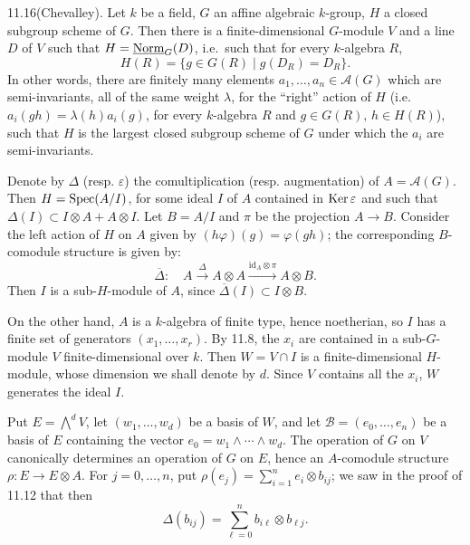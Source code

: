 \begin{theorem}{11.16}\label{VIB.11.16}\textup{(Chevalley).}
Let $k$ be a field, $G$ an affine algebraic $k$-group, $H$ a closed subgroup scheme of $G$. Then there is a finite-dimensional $G$-module $V$ and a line $D$ of $V$ such that $H=\underline{\mathrm{Norm}}_G(D)$, i.e.\ such that for every $k$-algebra $R$,
\[
H(R)=\{g\in G(R)\mid g(D_R)=D_R\}.
\]
In other words, there are finitely many elements $a_1,\ldots,a_n\in\mathscr A(G)$ which are semi-invariants, all of the same weight $\lambda$, for the ``right'' action of $H$ (i.e.\ $a_i(gh)=\lambda(h)a_i(g)$, for every $k$-algebra $R$ and $g\in G(R)$, $h\in H(R)$), such that $H$ is the largest closed subgroup scheme of $G$ under which the $a_i$ are semi-invariants.
\end{theorem}
Denote by $\Delta$ (resp. $\varepsilon$) the comultiplication (resp. augmentation) of $A=\mathscr A(G)$. Then $H=\operatorname{Spec}(A/I)$, for some ideal $I$ of $A$ contained in $\operatorname{Ker}\varepsilon$ and such that $\Delta(I)\subset I\otimes A+A\otimes I$. Let $B=A/I$ and $\pi$ be the projection $A\to B$. Consider the left action of $H$ on $A$ given by $(h\varphi)(g)=\varphi(gh)$; the corresponding $B$-comodule structure is given by:
\[
\overline\Delta:\quad A\xrightarrow{\Delta}A\otimes A\xrightarrow{\mathrm{id}_A\otimes\pi}A\otimes B.
\]
Then $I$ is a sub-$H$-module of $A$, since $\overline\Delta(I)\subset I\otimes B$.

On the other hand, $A$ is a $k$-algebra of finite type, hence noetherian, so $I$ has a finite set of generators $(x_1,\ldots,x_r)$. By 11.8, the $x_i$ are contained in a sub-$G$-module $V$ finite-dimensional over $k$. Then $W=V\cap I$ is a finite-dimensional $H$-module, whose dimension we shall denote by $d$. Since $V$ contains all the $x_i$, $W$ generates the ideal $I$.

Put $E=\bigwedge^d V$, let $(w_1,\ldots,w_d)$ be a basis of $W$, and let $\mathscr B=(e_0,\ldots,e_n)$ be a basis of $E$ containing the vector $e_0=w_1\wedge\cdots\wedge w_d$. The operation of $G$ on $V$ canonically determines an operation of $G$ on $E$, hence an $A$-comodule structure $\rho:E\to E\otimes A$. For $j=0,\ldots,n$, put $\rho(e_j)=\sum_{i=1}^n e_i\otimes b_{ij}$; we saw in the proof of 11.12 that then
\begin{equation*}\tag{*}
\Delta(b_{ij})=\sum_{\ell=0}^n b_{i\ell}\otimes b_{\ell j}.
\end{equation*}

